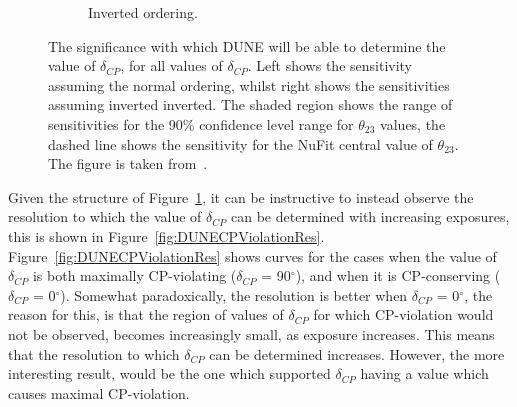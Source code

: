 \begin{figure}
\begin{subfigure}{0.49\textwidth}
    \caption{Inverted ordering.}
  \end{subfigure}
  \caption[The significance with which DUNE will be able to determine the value of $\delta_{CP}$, for all values of $\delta_{CP}$]
          {The significance with which DUNE will be able to determine the value of $\delta_{CP}$, for all values of $\delta_{CP}$. Left shows the sensitivity assuming the normal ordering, whilst right shows the sensitivities assuming inverted inverted. The shaded region shows the range of sensitivities for the 90\% confidence level range for $\theta_{23}$ values, the dashed line shows the sensitivity for the NuFit central value of $\theta_{23}$. The figure is taken from~\citep{DUNE2332}.}
  \label{fig:DUNECPViolation}
\end{figure}

Given the structure of Figure~\ref{fig:DUNECPViolation}, it can be instructive to instead observe the resolution to which the value of $\delta_{CP}$ can be determined with increasing exposures, this is shown in Figure~\ref{fig:DUNECPViolationRes}. Figure~\ref{fig:DUNECPViolationRes} shows curves for the cases when the value of $\delta_{CP}$ is both maximally CP-violating ($\delta_{CP}$ = 90$^{\circ}$), and when it is CP-conserving ($\delta_{CP}$ = 0$^{\circ}$). Somewhat paradoxically, the resolution is better when $\delta_{CP}$ = 0$^{\circ}$, the reason for this, is that the region of values of $\delta_{CP}$ for which CP-violation would not be observed, becomes increasingly small, as exposure increases. This means that the resolution to which $\delta_{CP}$ can be determined increases. However, the more interesting result, would be the one which supported $\delta_{CP}$ having a value which causes maximal CP-violation. \\

